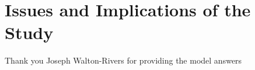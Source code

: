 \documentclass[manuscript,screen,review,sigconf]{acmart}
\begin{document}
\section{Issues and Implications of the Study}
% 

\begin{acks}
Thank you Joseph Walton-Rivers for providing the model answers
\end{acks}



\end{document}
